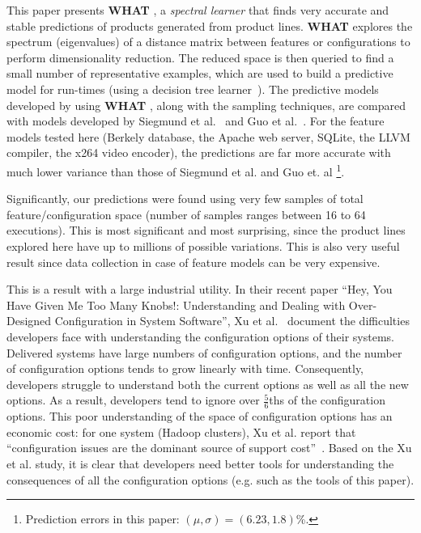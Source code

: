 \documentclass{sig-alternative}
\newcommand{\what}{{\bf WHAT }}
\begin{document}
This paper presents \what, a {\em spectral learner}     that finds very
accurate and  stable predictions of products generated from  product lines.
\what explores the spectrum (eigenvalues) of a distance matrix
between  features or configurations to perform dimensionality reduction. The reduced
space is then queried to find a small number of representative examples, which are used to
build a predictive model for run-times (using a decision tree learner~\cite{breiman1984}). The predictive models developed by using \what, along with the sampling techniques, are compared with models developed by Siegmund et al.~\cite{siegmund2012predicting} and Guo et al.~\cite{guo2013variability}. 
For the feature models tested here (Berkely database, the Apache web server, SQLite, the LLVM compiler, the x264 video encoder),
the  predictions are far more accurate with much lower variance than those of Siegmund et al. and Guo et. al \footnote{Prediction errors in this paper: $(\mu,\sigma) = (6.23,1.8)$\%.}.


Significantly, our predictions were found using   very few samples of total feature/configuration space
(number of samples ranges between 16 to 64 executions).
This is most significant and most surprising,  since the product lines explored here have up
to millions of possible variations. This is also very useful result since data collection in case 
of feature models can be very expensive.

This is a result with a large industrial utility.
In their recent paper ``Hey, You Have Given Me Too Many Knobs!: Understanding and Dealing with Over-Designed Configuration in System Software'', Xu et al.~\cite{xu2015hey} document the  difficulties developers face
with understanding  the configuration options of their systems.
Delivered systems have large numbers of configuration options, and the number of  configuration options tends to grow linearly
with time. Consequently, developers  struggle to understand both the current options as well as all the new options.
As a result, developers tend to ignore over $\frac{5}{6}$ths of the configuration options. 
This poor understanding of the space of configuration options has an economic cost:  for one system (Hadoop clusters),  Xu et al. report that ``configuration
issues are the dominant source of support cost''~\cite{xu2015hey}. 
Based on the Xu et al. study, it is clear that developers need better tools for understanding the 
consequences of all the configuration options (e.g. such as   the tools of this paper).
\end{document}
